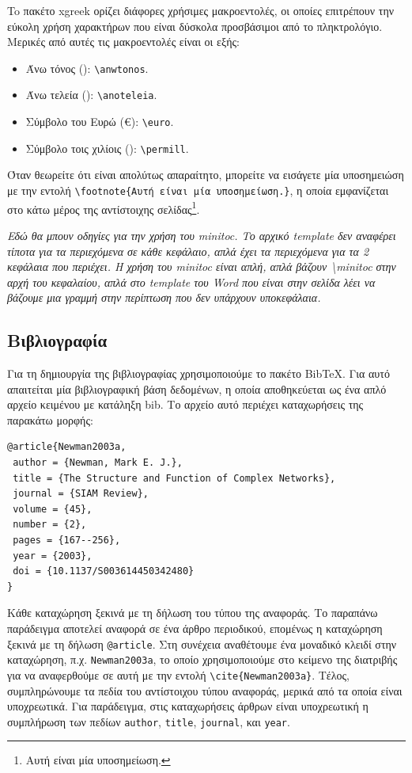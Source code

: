 To πακέτο xgreek ορίζει διάφορες χρήσιμες μακροεντολές, οι οποίες επιτρέπουν την εύκολη χρήση χαρακτήρων που είναι δύσκολα προσβάσιμοι από το πληκτρολόγιο.
Μερικές από αυτές τις μακροεντολές είναι οι εξής:
\begin{itemize}
	\item Άνω τόνος (\anwtonos): \verb|\anwtonos|.
	\item Άνω τελεία (\anoteleia): \verb|\anoteleia|.
	\item Σύμβολο του Ευρώ (\euro): \verb|\euro|.
	\item Σύμβολο τοις χιλίοις (\permill): \verb|\permill|.
\end{itemize}

Όταν θεωρείτε ότι είναι απολύτως απαραίτητο, μπορείτε να εισάγετε μία υποσημειώση με την εντολή \verb|\footnote{Αυτή είναι μία υποσημείωση.}|, η οποία εμφανίζεται στο κάτω μέρος της αντίστοιχης σελίδας\footnote{Αυτή είναι μία υποσημείωση.}.

{\color{red}
\textit{Εδώ θα μπουν οδηγίες για την χρήση του minitoc. Το αρχικό
template δεν αναφέρει τίποτα για τα περιεχόμενα σε κάθε κεφάλαιο,
απλά έχει τα περιεχόμενα για τα 2 κεφάλαια που περιέχει. Η χρήση
του minitoc είναι απλή, απλά βάζουν \textbackslash minitoc στην αρχή του κεφαλαίου,
απλά στο template του Word που είναι στην σελίδα λέει να βάζουμε μια
γραμμή στην περίπτωση που δεν υπάρχουν υποκεφάλαια.}}

\subsection{Βιβλιογραφία}
\label{subsec:Bibliography}

Για τη δημιουργία της βιβλιογραφίας χρησιμοποιούμε το πακέτο BibTeX.
Για αυτό απαιτείται μία βιβλιογραφική βάση δεδομένων, η οποία αποθηκεύεται ως ένα απλό αρχείο κειμένου με κατάληξη bib.
Το αρχείο αυτό περιέχει καταχωρήσεις της παρακάτω μορφής:

\begin{verbatim}
@article{Newman2003a,
 author = {Newman, Mark E. J.},
 title = {The Structure and Function of Complex Networks},
 journal = {SIAM Review},
 volume = {45},
 number = {2},
 pages = {167--256},
 year = {2003},
 doi = {10.1137/S003614450342480}
}
\end{verbatim}

Κάθε καταχώρηση ξεκινά με τη δήλωση του τύπου της αναφοράς.
Το παραπάνω παράδειγμα αποτελεί αναφορά σε ένα άρθρο περιοδικού, επομένως η καταχώρηση ξεκινά με τη δήλωση \verb|@article|.
Στη συνέχεια αναθέτουμε ένα μοναδικό κλειδί στην καταχώρηση, π.χ. \verb|Newman2003a|, το οποίο χρησιμοποιούμε στο κείμενο της διατριβής για να αναφερθούμε σε αυτή με την εντολή \verb|\cite{Newman2003a}|.
Τέλος, συμπληρώνουμε τα πεδία του αντίστοιχου τύπου αναφοράς, μερικά από τα οποία είναι υποχρεωτικά.
Για παράδειγμα, στις καταχωρήσεις άρθρων είναι υποχρεωτική η συμπλήρωση των πεδίων \verb|author|, \verb|title|, \verb|journal|, και \verb|year|.

